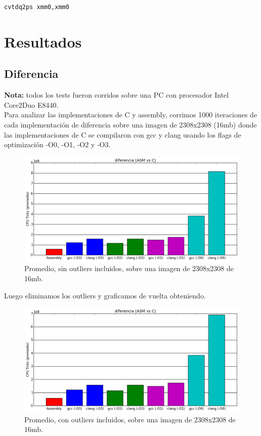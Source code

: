 \documentclass[a4paper]{article}
\begin{document}
\begin{codesnippet}
\begin{verbatim}
cvtdq2ps xmm0,xmm0
\end{verbatim}
\end{codesnippet}



\newpage



\section{Resultados}

\subsection{Diferencia}

\noindent \textbf{Nota:} todos los tests fueron corridos sobre una PC con procesador Intel Core2Duo E8440.
\\
\noindent Para analizar las implementaciones de C y assembly, corrimos 1000 iteraciones de cada implementación de diferencia sobre una imagen de 2308x2308 (16mb) donde las implementaciones de C se compilaron con gcc y clang usando los flags de optimización -O0, -O1, -O2 y -O3.


\begin{figure}[h]
\includegraphics[scale=0.56]{imagenes/test_difrencia_ASM_C_promedio.png}
\caption{Promedio, sin outliers incluidos, sobre una imagen de 2308x2308 de 16mb.}
\end{figure}

\noindent Luego eliminamos los outliers y graficamos de vuelta obteniendo.\\


\begin{figure}[h]
\includegraphics[scale=0.56]{imagenes/test_difrencia_ASM_C_no_outliers.png}
\caption{Promedio, con outliers incluidos, sobre una imagen de 2308x2308 de 16mb.}
\end{figure}
\end{document}
